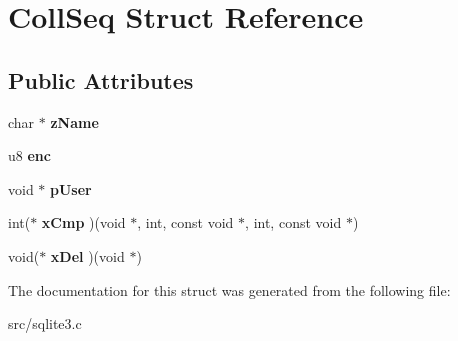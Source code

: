 \hypertarget{struct_coll_seq}{\section{Coll\-Seq Struct Reference}
\label{struct_coll_seq}
}
\subsection*{Public Attributes}
\begin{DoxyCompactItemize}
\item 
\hypertarget{struct_coll_seq_a48d6d5f71d4f8a3ab122903464e8b4a1}{char $\ast$ {\bfseries z\-Name}}\label{struct_coll_seq_a48d6d5f71d4f8a3ab122903464e8b4a1}

\item 
\hypertarget{struct_coll_seq_add27da1a70ed6f538447e9183eeb4838}{u8 {\bfseries enc}}\label{struct_coll_seq_add27da1a70ed6f538447e9183eeb4838}

\item 
\hypertarget{struct_coll_seq_a3cee924d41e730ccec7f686eb5b6f041}{void $\ast$ {\bfseries p\-User}}\label{struct_coll_seq_a3cee924d41e730ccec7f686eb5b6f041}

\item 
\hypertarget{struct_coll_seq_a47fc6d3a01eee354332ca515a8b493ce}{int($\ast$ {\bfseries x\-Cmp} )(void $\ast$, int, const void $\ast$, int, const void $\ast$)}\label{struct_coll_seq_a47fc6d3a01eee354332ca515a8b493ce}

\item 
\hypertarget{struct_coll_seq_a1c0dd3ad98c7bb2ef517f9170134a125}{void($\ast$ {\bfseries x\-Del} )(void $\ast$)}\label{struct_coll_seq_a1c0dd3ad98c7bb2ef517f9170134a125}

\end{DoxyCompactItemize}


The documentation for this struct was generated from the following file\-:\begin{DoxyCompactItemize}
\item 
src/sqlite3.\-c\end{DoxyCompactItemize}
